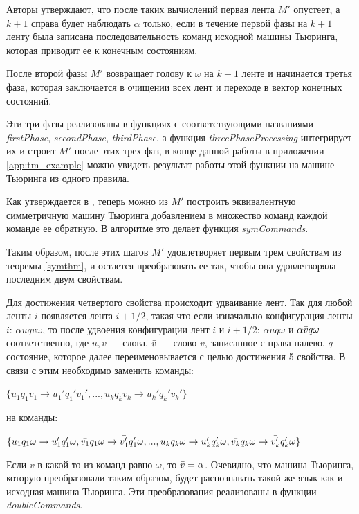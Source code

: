 \documentclass[14pt]{matmex-diploma-custom}
\begin{document}
Авторы утверждают, что после таких вычислений первая лента $M'$  опустеет, а $k+1$ справа будет наблюдать $\alpha$ только, если в течение первой фазы на $k+1$ ленту была записана последовательность команд исходной машины Тьюринга, которая приводит ее к конечным состояниям. 

После второй фазы $M'$ возвращает голову к $\omega$ на $k+1$ ленте и начинается третья фаза, которая заключается в очищении всех лент и переходе в вектор конечных состояний. 

Эти три фазы реализованы в функциях с соответствующими названиями \textit{firstPhase}, \textit{secondPhase}, \textit{thirdPhase}, а функция \textit{threePhaseProcessing} интегрирует их и строит $M'$ после этих трех фаз, в конце данной работы в приложении \ref{app:tm_example} можно увидеть результат работы этой функции на машине Тьюринга из одного правила. 

Как утверждается в \cite{symTM}, теперь можно из $M'$ построить эквивалентную симметричную машину Тьюринга добавлением в множество команд каждой команде ее обратную. В алгоритме это делает функция \textit{symCommands}. 

Таким образом, после этих шагов $M'$ удовлетворяет первым трем свойствам из теоремы \ref{symthm}, и остается преобразовать ее так, чтобы она удовлетворяла последним двум свойствам. 

Для достижения четвертого свойства происходит удваивание лент. Так для любой ленты $i$ появляется лента $i + 1/2$, такая что если изначально конфигурация ленты $i$: $\alpha u q v \omega$, то после удвоения конфигурации лент $i$ и $i+1/2$: $\alpha u q \omega$ и $\alpha \Bar{v} q \omega$ соответственно, где $u,v$ --- слова, $\Bar{v}$ --- слово $v$, записанное с права налево, $q$ состояние, которое далее переименовывается с целью достижения 5 свойства. В связи с этим необходимо заменить команды:
\begin{center}
    $\{ u_1 q_1 v_1 \to u_1' q_1' v_1',  ... , u_k q_k v_k \to u_k' q_k' v_k' \}$
\end{center}
на команды:
\begin{center}
    $\{ u_1 q_1 \omega \to u_1' q_1' \omega, \Bar{v_1} q_1 \omega \to \Bar{v'_1} q_1' \omega , ... , u_k q_k \omega \to u_k' q_k' \omega, \Bar{v_k} q_k \omega \to \Bar{v'_k} q_k' \omega \}$
\end{center}
Если $v$ в какой-то из команд равно $\omega$, то $\Bar{v} = \alpha$. Очевидно, что машина Тьюринга, которую преобразовали таким образом, будет распознавать такой же язык как и исходная машина Тьюринга. Эти преобразования реализованы в функции \textit{doubleCommands}. 
\end{document}
